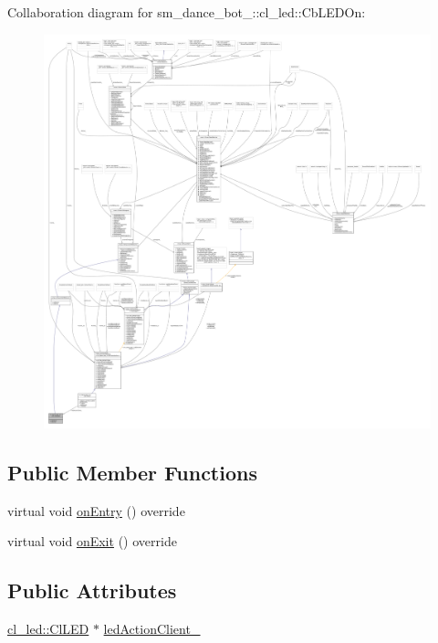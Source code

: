 Collaboration diagram for sm\+\_\+dance\+\_\+bot\+\_\+:\+:cl\+\_\+led\+:\+:Cb\+L\+E\+D\+On\+:
\nopagebreak
\begin{figure}[H]
\begin{center}
\leavevmode
\includegraphics[width=350pt]{classsm__dance__bot__2_1_1cl__led_1_1CbLEDOn__coll__graph}
\end{center}
\end{figure}
\subsection*{Public Member Functions}
\begin{DoxyCompactItemize}
\item 
virtual void \hyperlink{classsm__dance__bot__2_1_1cl__led_1_1CbLEDOn_adee6590f4b50a9cf26cf22f6e39b7965}{on\+Entry} () override
\item 
virtual void \hyperlink{classsm__dance__bot__2_1_1cl__led_1_1CbLEDOn_a461d3e1829d785ab490fce9827868e39}{on\+Exit} () override
\end{DoxyCompactItemize}
\subsection*{Public Attributes}
\begin{DoxyCompactItemize}
\item 
\hyperlink{classsm__dance__bot__2_1_1cl__led_1_1ClLED}{cl\+\_\+led\+::\+Cl\+L\+ED} $\ast$ \hyperlink{classsm__dance__bot__2_1_1cl__led_1_1CbLEDOn_aceeb4355c0578e62047388ad21c9df8b}{led\+Action\+Client\+\_\+}
\end{DoxyCompactItemize}
